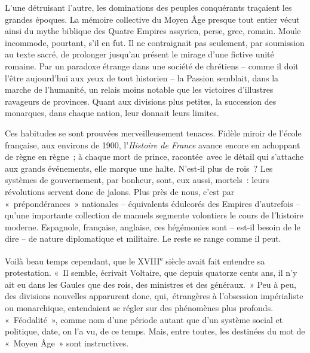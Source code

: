 \documentclass[french,twoside]{book} %
\newcommand{\astermono}{\medskip\centerline{\color{rubric}\large\selectfont{\syms ✻}}\medskip\par}%
\begin{document}
L’une détruisant l’autre, les dominations des peuples conquérants traçaient les grandes époques. La mémoire collective du Moyen Âge presque tout entier vécut ainsi du mythe biblique des Quatre Empires assyrien, perse, grec, romain. Moule incommode, pourtant, s’il en fut. Il ne contraignait pas seulement, par soumission au texte sacré, de pro­longer jusqu’au présent le mirage d’une fictive unité romaine. Par un paradoxe étrange dans une société de chrétiens – comme il doit l’être aujourd’hui aux yeux de tout historien – la Passion semblait, dans la marche de l’humanité, un relais moins notable que les victoires d’illustres ravageurs de provinces. Quant aux divisions plus petites, la succession des monarques, dans chaque nation, leur donnait leurs limites.\par
Ces habitudes se sont prouvées merveilleusement tenaces. Fidèle miroir de l’école française, aux environs de 1900, l’\emph{Histoire de France} avance encore en achoppant de règne en règne ; à chaque mort de prince, racontée avec le détail qui s’attache aux grands événements, elle marque une halte. N’est‑il plus de rois ? Les systèmes de gouvernement, par bonheur, sont, eux aussi, mortels : leurs révolutions servent donc de jalons. Plus près de nous, c’est par « prépondérances » nationales – équivalents édul­corés des Empires d’autrefois – qu’une importante collection de manuels segmente volontiers le cours de l’histoire moderne. Espagnole, française, anglaise, ces hégémonies sont – est‑il besoin de le dire – de nature diplomatique et militaire. Le reste se range comme il peut.\par
Voilà beau temps cependant, que le XVIII\textsuperscript{e} siècle avait fait entendre sa protestation. « Il semble, écrivait Voltaire, que depuis quatorze cents ans, il n’y ait eu dans les Gaules que des rois, des ministres et des généraux. » Peu à peu, des divisions nouvelles apparurent donc, qui, ­étrangères à l’obsession impérialiste ou monarchique, entendaient se régler sur des phénomènes plus profonds. « Féodalité », comme nom d’une période autant que d’un système social et politique, date, on l’a vu, de ce temps. Mais, entre toutes, les destinées du mot de « Moyen Âge » sont instructives.\par

\astermono
\end{document}
